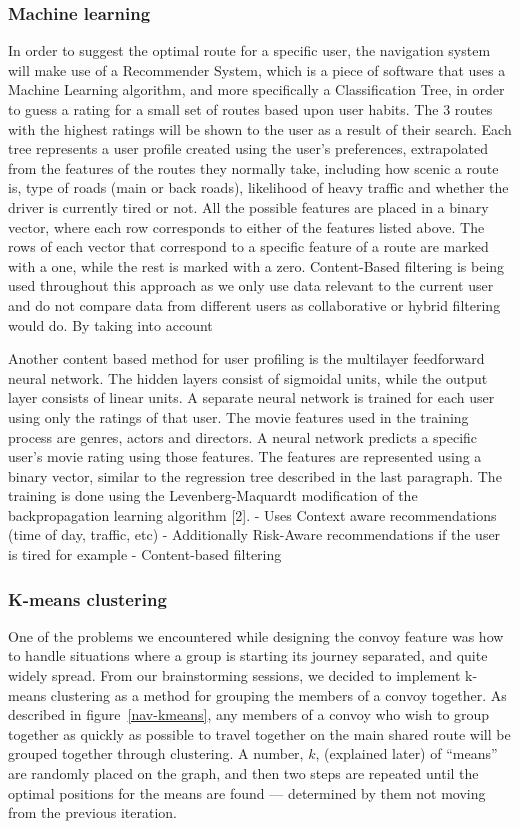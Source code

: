 \documentclass{article}
\begin{document}
\subsubsection{Machine learning}\label{sssec:nav-tech-machinelearning}
In order to suggest the optimal route for a specific user, the navigation system will make use of a Recommender System, which is a piece of software that uses a Machine Learning algorithm, and more specifically a Classification Tree, in order to guess a rating for a small set of routes based upon user habits. The 3 routes with the highest ratings will be shown to the user as a result of their search. Each tree represents a user profile created using the user’s preferences, extrapolated from the features of the routes they normally take, including how scenic a route is, type of roads (main or back roads), likelihood of heavy traffic and whether the driver is currently tired or not. All the possible features are placed in a binary vector, where each row corresponds to either of the features listed above. The rows of each vector that correspond to a specific feature of a route are marked with a one, while the rest is marked with a zero. Content-Based filtering is being used throughout this approach as we only use data relevant to the current user and do not compare data from different users as collaborative or hybrid filtering would do. By taking into account 

Another content based method for user profiling is the multilayer feedforward neural network. The hidden layers consist of sigmoidal units, while the output layer consists of linear units. A separate neural network is trained for each user using only the ratings of that user. The movie features used in the training process are genres, actors and directors. A neural network predicts a specific user’s movie rating using those features. The features are represented using a binary vector, similar to the regression tree described in the last
paragraph. The training is done using the Levenberg-Maquardt modification of the backpropagation learning algorithm [2].
- Uses Context aware recommendations (time of day, traffic, etc)
    - Additionally Risk-Aware recommendations if the user is tired for example
- Content-based filtering
%
%
\subsubsection{K-means clustering}\label{sssec:nav-tech-kmeans}
One of the problems we encountered while designing the convoy feature was how to handle situations where a group is starting its journey separated, and quite widely spread. From our brainstorming sessions, we decided to implement k-means clustering as a method for grouping the members of a convoy together. As described in figure~\ref{nav-kmeans}, any members of a convoy who wish to group together as quickly as possible to travel together on the main shared route will be grouped together through clustering. A number, $k$, (explained later) of ``means'' are randomly placed on the graph, and then two steps are repeated until the optimal positions for the means are found --- determined by them not moving from the previous iteration.
\end{document}
